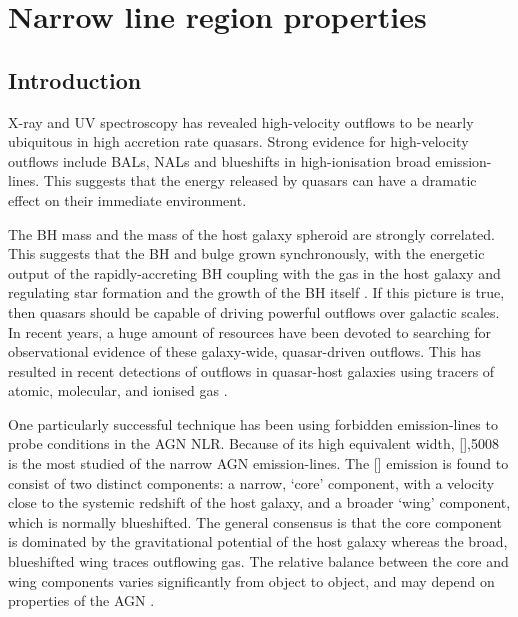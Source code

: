 
\chapter{Narrow line region properties}
\label{ch:nlr} 

\section{Introduction}

X-ray and UV spectroscopy has revealed high-velocity outflows to be nearly ubiquitous in high accretion rate quasars.
Strong evidence for high-velocity outflows include BALs, NALs and blueshifts in high-ionisation broad emission-lines. 
This suggests that the energy released by quasars can have a dramatic effect on their immediate environment. 

The BH mass and the mass of the host galaxy spheroid are strongly correlated.
This suggests that the BH and bulge grown synchronously, with the energetic output of the rapidly-accreting BH coupling with the gas in the host galaxy and regulating star formation and the growth of the BH itself \citep[e.g.][]{silk98,king03,dimatteo05,king15}.
If this picture is true, then quasars should be capable of driving powerful outflows over galactic scales. 
In recent years, a huge amount of resources have been devoted to searching for observational evidence of these galaxy-wide, quasar-driven outflows. 
This has resulted in recent detections of outflows in quasar-host galaxies using tracers of atomic, molecular, and ionised gas \citep[e.g.][]{nesvadba06,arav08,nesvadba08,moe09,dunn10,alexander10,harrison12,harrison14,nesvadba10,rupke13,veilleux13,nardini15,feruglio10,alatalo11,cimatti13,cicone14}.  

One particularly successful technique has been using forbidden emission-lines to probe conditions in the AGN NLR. 
Because of its high equivalent width, [],5008 is the most studied of the narrow AGN emission-lines. 
The [] emission is found to consist of two distinct components: a narrow, `core' component, with a velocity close to the systemic redshift of the host galaxy, and a broader `wing' component, which is normally blueshifted. 
The general consensus is that the core component is dominated by the gravitational potential of the host galaxy whereas the broad, blueshifted wing traces outflowing gas. 
The relative balance between the core and wing components varies significantly from object to object, and may depend on properties of the AGN \citep[e.g. luminosity;][]{shen14}. 

